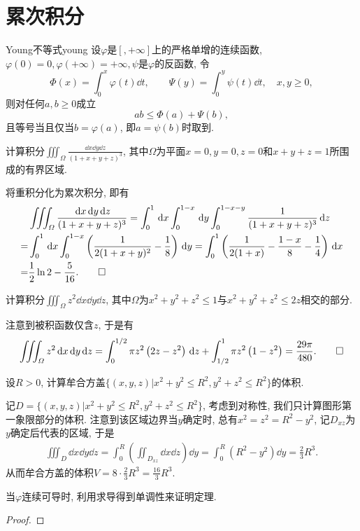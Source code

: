 \section{累次积分}
\begin{theorem}{Young不等式}{young}
设\(\varphi\)是\(\left[,+\infty\right]\)上的严格单增的连续函数, \(\varphi(0)=0,\varphi(+\infty)=+\infty,\psi\)是\(\varphi\)的反函数, 令\[\varPhi(x)=\int_0^x\varphi(t)\dd t,\qquad\varPsi(y)=\int_{0}^{y}\psi(t)\dd t,\quad x,y\geqslant 0,\]则对任何\(a,b\geqslant 0\)成立\[ab\leqslant\varPhi(a)+\varPsi(b),\]且等号当且仅当\(b=\varphi(a)\), 即\(a=\psi(b)\)时取到.
\end{theorem}
\begin{quiza}
\woe 计算积分\(\iiint_\varOmega \frac{\dd x\dd y \dd z}{(1+x+y+z)^3}\), 其中\(\varOmega\)为平面\(x=0,y=0,z=0\)和\(x+y+z=1\)所围成的有界区域.
\begin{solution}
将重积分化为累次积分, 即有\[\begin{split}
&\iiint_{\varOmega}\frac{\,\mathrm{d} x\,\mathrm{d} y\,\mathrm{d} z}{(1+x+y+z)^3}=\int_{0}^{1}\,\mathrm{d} x\int_{0}^{1-x}\,\mathrm{d} y\int_{0}^{1-x-y}\frac{1}{(1+x+y+z)^3}\,\mathrm{d} z\\=&\int_{0}^{1}\,\mathrm{d} x\int_{0}^{1-x}\left(\frac{1}{2(1+x+y)^2}-\frac{1}{8}\right)\,\mathrm{d} y=\int_{0}^{1}\left(\frac{1}{2(1+x)}-\frac{1-x}{8}-\frac{1}{4}\right)\,\mathrm{d} x\\=&\frac{1}{2}\ln 2-\frac{5}{16}.\qedhere
\end{split}\]
\end{solution}
\woe 计算积分\(\iiint_\varOmega z^2\dd x\dd y \dd z\), 其中\(\varOmega\)为\(x^2+y^2+z^2\leqslant 1\)与\(x^2+y^2+z^2\leqslant 2z\)相交的部分.
\begin{solution}
注意到被积函数仅含\(z\), 于是有\[\iiint_{\varOmega}z^2\,\mathrm{d} x\,\mathrm{d} y\,\mathrm{d} z=\int_{0}^{1/2}\pi z^2\left(2z-z^2\right)\,\mathrm{d} z+\int_{1/2}^{1}\pi z^2\left(1-z^2\right)=\frac{29\pi}{480}.\qedhere\]
\end{solution}
\woe 设\(R>0\), 计算牟合方盖\(\{(x,y,z)\big|x^2+y^2\leqslant R^2,y^2+z^2\leqslant R^2\}\)的体积.
\begin{solution}
记\(D=\{(x,y,z)\big|x^2+y^2\leqslant R^2,y^2+z^2\leqslant R^2\}\), 考虑到对称性, 我们只计算图形第一象限部分的体积. 注意到该区域边界当\(y\)确定时, 总有\(x^2=z^2=R^2-y^2\), 记\(D_{xz}\)为\(y\)确定后代表的区域, 于是\[\begin{split}
\iiint_{D}\dd x\dd y\dd z=\int_{0}^{R}\left(\iint_{D_{xz}}\dd x\dd z\right)\dd y=\int_{0}^{R}\left(R^2-y^2\right)\dd y=\frac{2}{3}R^3.
\end{split}\]从而牟合方盖的体积\(V=8\cdot\frac{2}{3}R^3=\frac{16}{3}R^3.\)
\end{solution}
\woe 当\(\varphi\)连续可导时, 利用求导得到单调性来证明定理.
\begin{proof}


\end{proof}
\end{quiza}
